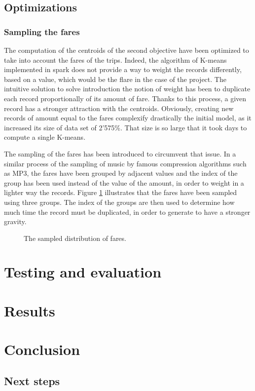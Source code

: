 \documentclass[a4paper]{article}
\begin{document}
\subsection{Optimizations}
\subsubsection{Sampling the fares}
The computation of the centroids of the second objective have been optimized to take into account the fares of the trips. Indeed, the algorithm of K-means implemented in spark does not provide a way to weight the records differently, based on a value, which would be the flare in the case of the project. The intuitive solution to solve introduction the notion of weight has been to duplicate each record proportionally of its amount of fare. Thanks to this process, a given record has a stronger attraction with the centroids. Obviously, creating new records of amount equal to the fares complexify drastically the initial model, as it increased its size of data set of 2'575\%. That size is so large that it took days to compute a single K-means.

The sampling of the fares has been introduced to circumvent that issue. In a similar process of the sampling of music by famous compression algorithms such as MP3, the fares have been grouped by adjacent values and the index of the group has been used instead of the value of the amount, in order to weight in a lighter way the records. Figure \ref{fig:distribution-fares-sampled} illustrates that the fares have been sampled using three groups. The index of the groups are then used to determine how much time the record must be duplicated, in order to generate to have a stronger gravity.

\begin{figure}
  \centering
  \caption{The sampled distribution of fares.}
  \label{fig:distribution-fares-sampled}
\end{figure}


\section{Testing and evaluation}

\section{Results}

\section{Conclusion}
\subsection{Next steps}
\end{document}

